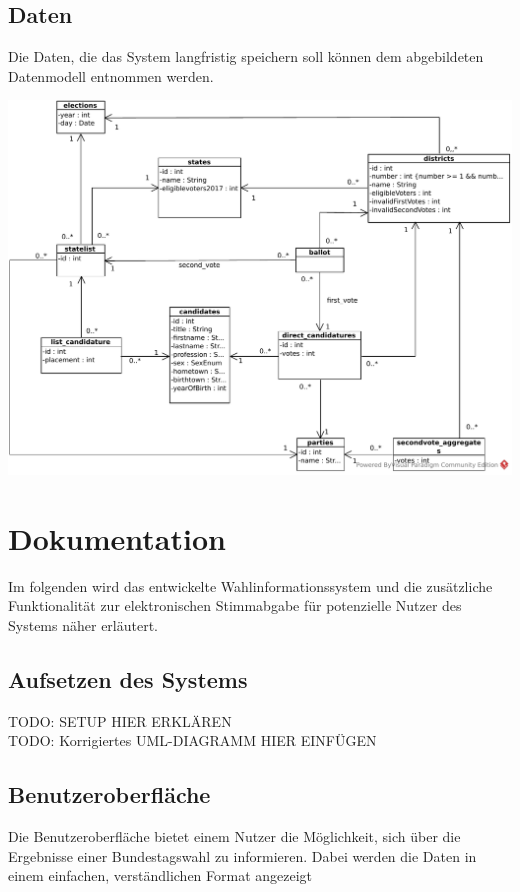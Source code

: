 \documentclass[a4paper]{scrreprt}
\begin{document}
\section{Daten}
Die Daten, die das System langfristig speichern soll können dem abgebildeten Datenmodell entnommen werden.

\includegraphics[width=\textwidth]{images/DBS_Schema.pdf}


\chapter{Dokumentation}

Im folgenden wird das entwickelte Wahlinformationssystem und die zusätzliche Funktionalität zur elektronischen Stimmabgabe für potenzielle Nutzer des Systems näher erläutert.

\section{Aufsetzen des Systems}

TODO: SETUP HIER ERKLÄREN \\
TODO: Korrigiertes UML-DIAGRAMM HIER EINFÜGEN

\section{Benutzeroberfläche}

Die Benutzeroberfläche bietet einem Nutzer die Möglichkeit, sich über die Ergebnisse einer Bundestagswahl zu informieren. Dabei werden die Daten in einem einfachen, verständlichen Format angezeigt
\end{document}
